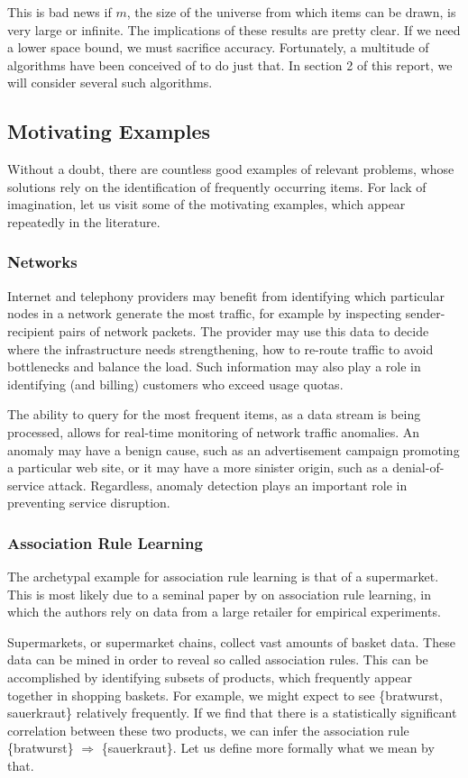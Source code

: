 \documentclass[a4paper]{article}
\begin{document}
This is bad news if $m$, the size of the universe from which items can be drawn, is very large or infinite. The implications of these results are pretty clear. If we need a lower space bound, we must sacrifice accuracy. Fortunately, a multitude of algorithms have been conceived of to do just that. In section 2 of this report, we will consider several such algorithms.

\subsection{Motivating Examples}
Without a doubt, there are countless good examples of relevant problems, whose solutions rely on the identification of frequently occurring items. For lack of imagination, let us visit some of the motivating examples, which appear repeatedly in the literature.

\subsubsection{Networks}
Internet and telephony providers may benefit from identifying which particular nodes in a network generate the most traffic, for example by inspecting sender-recipient pairs of network packets. The provider may use this data to decide where the infrastructure needs strengthening, how to re-route traffic to avoid bottlenecks and balance the load. Such information may also play a role in identifying (and billing) customers who exceed usage quotas. 

The ability to query for the most frequent items, as a data stream is being processed, allows for real-time monitoring of network traffic anomalies. An anomaly may have a benign cause, such as an advertisement campaign promoting a particular web site, or it may have a more sinister origin, such as a denial-of-service attack. Regardless, anomaly detection plays an important role in preventing service disruption.

\subsubsection{Association Rule Learning}
The archetypal example for association rule learning is that of a supermarket. This is most likely due to a seminal paper by \cite{Agrawal:1993:MAR:170036.170072} on association rule learning, in which the authors rely on data from a large retailer for empirical experiments. 

Supermarkets, or supermarket chains, collect vast amounts of basket data. These data can be mined in order to reveal so called association rules. This can be accomplished by identifying subsets of products, which frequently appear together in shopping baskets. For example, we might expect to see \{bratwurst, sauerkraut\} relatively frequently. If we find that there is a statistically significant correlation between these two products, we can infer the association rule \{bratwurst\} $\Rightarrow$ \{sauerkraut\}. Let us define more formally what we mean by that.
\end{document}
